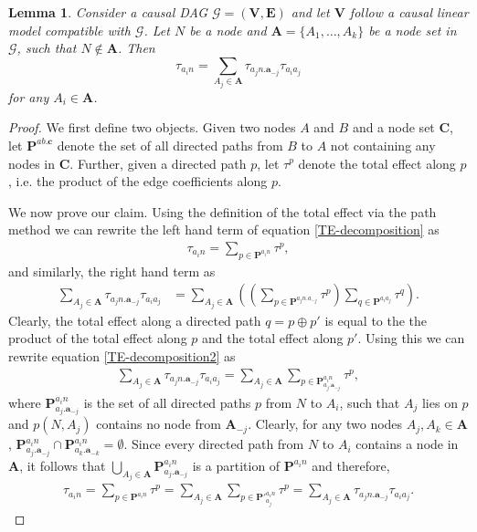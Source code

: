 \documentclass[11pt,a4paper]{article}
\newtheorem{Lemma}[Satz]{Lemma}
\theoremstyle{definition}
\theoremstyle{remark}
\newcommand{\g}[1][G]{\mathcal{#1}}
\begin{document}
\begin{Lemma}
	Consider a causal DAG $\g=(\mathbf{V},\mathbf{E})$ and let $\mathbf{V}$ follow a causal linear model compatible with $\g$. Let $N$ be a node and $\mathbf{A}=\{A_1,\dots, A_k\}$ be a node set in $\g$, such that $N \notin \mathbf{A}$. Then 
	\begin{equation}
	\tau_{a_in} = \sum_{A_j \in \mathbf{A}} \tau_{a_jn.\mathbf{a}_{-j}} \tau_{a_ia_j}
	\label{TE-decomposition}
	\end{equation}
	 for any $A_i \in \mathbf{A}$.
	 \label{lemma: TE-decomposition}
\end{Lemma}

\begin{proof}
	We first define two objects. Given two nodes $A$ and $B$ and a node set $\mathbf{C}$, let $\mathbf{P}^{ab.\mathbf{c}}$ denote the set of all directed paths from $B$ to $A$ not containing any nodes in $\mathbf{C}$. Further, given a directed path $p$, let $\tau^p$ denote the total effect along $p$, i.e. the product of the edge coefficients along $p$.
	
	We now prove our claim. Using the definition of the total effect via the path method we can rewrite the left hand term of equation \eqref{TE-decomposition} as
	\begin{align*}
	\tau_{a_in} = \sum_{p \in \mathbf{P}^{a_in}} \tau^p,
	\end{align*}
	and similarly, the right hand term as 
	\begin{align}
	\sum_{A_j \in \mathbf{A}} \tau_{a_jn.\mathbf{a}_{-j}} \tau_{a_ia_j}  &= \sum_{A_j \in \mathbf{A}} \left( \left( \sum_{p \in \mathbf{P}^{a_jn.a_{-j}}} \tau^{p} \right) \sum_{q \in \mathbf{P}^{a_ia_j}} \tau^{q} \right).  
\label{TE-decomposition2}
	\end{align}
	Clearly, the total effect along a directed path $q=p \oplus p'$ is equal to the the product of the total effect along $p$ and the total effect along $p'$. Using this we can rewrite equation \eqref{TE-decomposition2} as
	\begin{align*}
	\sum_{A_j \in \mathbf{A}} \tau_{a_jn.\mathbf{a}_{-j}} \tau_{a_ia_j}= \sum_{A_j \in \mathbf{A}} \sum_{p \in \mathbf{P}^{a_in}_{a_j.\mathbf{a}_{-j}}} \tau^{p},
	\end{align*}
	where $\mathbf{P}^{a_in}_{a_j.\mathbf{a}_{-j}}$ is the set of all directed paths $p$ from $N$ to $A_i$, such that $A_j$ lies on $p$ and $p(N,A_j)$ contains no node from $\mathbf{A}_{-j}$. Clearly, for any two nodes $A_j, A_k \in \mathbf{A}$, $\mathbf{P}^{a_in}_{a_j.\mathbf{a}_{-j}} \cap \mathbf{P}^{a_in}_{a_k.\mathbf{a}_{-k}} = \emptyset$. Since every directed path from $N$ to $A_i$ contains a node in $\mathbf{A}$, it follows that $\bigcup_{A_j \in \mathbf{A}} \mathbf{P}^{a_in}_{a_j.\mathbf{a}_{-j}}$ is a partition of $\mathbf{P}^{a_in}$ and therefore,
	\begin{align*}
		\tau_{a_in} = \sum_{p \in \mathbf{P}^{a_in}} \tau^p = 
		\sum_{A_j \in \mathbf{A}} \sum_{p \in \mathbf{P'}^{a_in}_{a_j}} \tau^{p} = 
		\sum_{A_j \in \mathbf{A}} \tau_{a_jn.\mathbf{a}_{-j}} \tau_{a_ia_j}. 
	\end{align*}
\end{proof}
\end{document}

